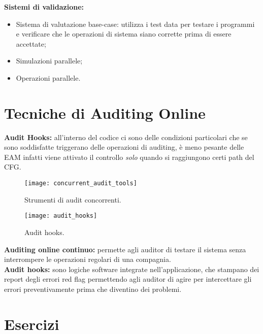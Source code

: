 \textbf{Sistemi di validazione:}

\begin{itemize}
    \item Sistema di valutazione base-case: utilizza i test data per testare i programmi e verificare che 
    le operazioni di sistema siano corrette prima di essere accettate;
    \item Simulazioni parallele;
    \item Operazioni parallele.
\end{itemize}

\section{Tecniche di Auditing Online}

\textbf{Audit Hooks:} all'interno del codice ci sono delle condizioni particolari che se
sono soddisfatte triggerano delle operazioni di auditing, è meno pesante delle
EAM infatti viene attivato il controllo \emph{solo} quando si raggiungono certi path
del CFG.

\begin{figure}[h!]
        \begin{center}
                \texttt{[image: concurrent\_audit\_tools]}
        \end{center}
        \caption{Strumenti di audit concorrenti.}
        \label{fig:concurrent:audit:tools}
\end{figure}

\begin{figure}[h!]
        \begin{center}
                \texttt{[image: audit\_hooks]}
        \end{center}
        \caption{Audit hooks.}
        \label{fig:audit:hooks}
\end{figure}

\textbf{Auditing online continuo:} permette agli auditor di testare il sistema senza
interrompere le operazioni regolari di una compagnia.\\
\newline
\textbf{Audit hooks:} sono logiche software integrate nell'applicazione, che stampano 
dei report degli errori red flag permettendo agli auditor di agire per intercettare gli 
errori preventivamente prima che diventino dei problemi.

\section{Esercizi}

